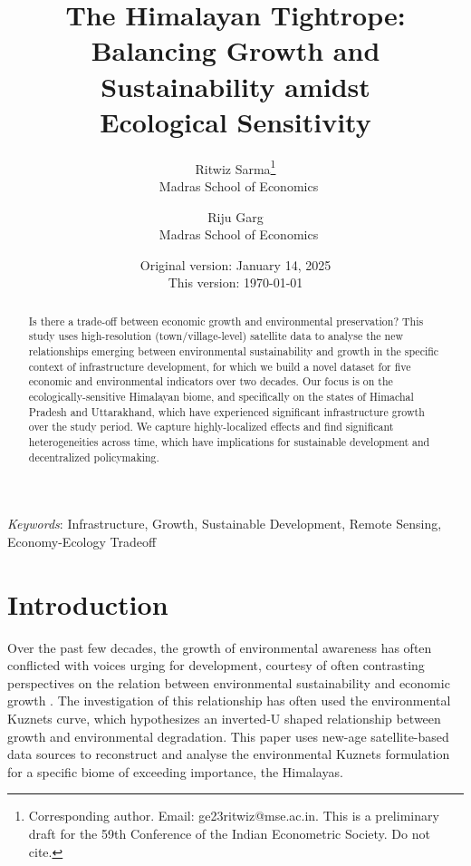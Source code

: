\documentclass[a4paper,12pt]{article}
\title{\LARGE The Himalayan Tightrope:\\ \Large Balancing Growth and Sustainability amidst\\ Ecological Sensitivity}
\author{Ritwiz Sarma\thanks{Corresponding author. Email: ge23ritwiz@mse.ac.in. This is a preliminary draft for the 59th Conference of the Indian Econometric Society. Do not cite.}\\\small~Madras School of Economics \and Riju Garg\\\small~Madras School of Economics} %
\date{Original version: January 14, 2025\\This version: \today}
\begin{document}
\setlength{\droptitle}{-1.5cm}
\pagestyle{empty}
\maketitle
\begin{abstract}

    Is there a trade-off between economic growth and environmental preservation? This study uses high-resolution (town/village-level) satellite data to analyse the new relationships emerging between environmental sustainability and growth in the specific context of infrastructure development, for which we build a novel dataset for five economic and environmental indicators over two decades. Our focus is on the ecologically-sensitive Himalayan biome, and specifically on the states of Himachal Pradesh and Uttarakhand, which have experienced significant infrastructure growth over the study period. We capture highly-localized effects and find significant heterogeneities across time, which have implications for sustainable development and decentralized policymaking.

\end{abstract}
\vfill
\textit{Keywords}: Infrastructure, Growth, Sustainable Development, Remote Sensing, Economy-Ecology Tradeoff
\newpage
{}
\pagestyle{plain}

\section{Introduction}


Over the past few decades, the growth of environmental awareness has often conflicted with voices urging for development, courtesy of often contrasting perspectives on the relation between environmental sustainability and economic growth \parencite{arrow1995,grossman1991,grossman1995,list1999,selden1994,shafik1992}. The investigation of this relationship has often used the environmental Kuznets curve, which hypothesizes an inverted-U shaped relationship between growth and environmental degradation. This paper uses new-age satellite-based data sources to reconstruct and analyse the environmental Kuznets formulation for a specific biome of exceeding importance, the Himalayas.
\end{document}
